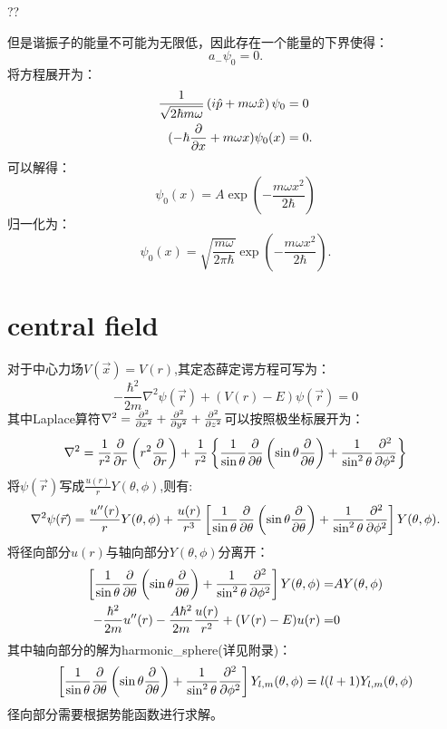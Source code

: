??


但是谐振子的能量不可能为无限低，因此存在一个能量的下界使得：
\begin{equation}
    a_-\psi_0=0.
\end{equation}
将方程展开为：
\begin{equation}
    \begin{aligned}
        \frac{1}{\sqrt{2\hbar m\omega}}\left(i\hat{p}+m\omega \hat{x}\right)\psi_0&=0\\
        (-\hbar\frac{\partial }{\partial x}+m\omega x)\psi_0(x)&=0.
    \end{aligned}
\end{equation}
可以解得：
\begin{equation}
    \psi_0(x)=A\exp\left(-\frac{m\omega x^2}{2\hbar}\right)
\end{equation}
归一化为：
\begin{equation}
    \psi_0(x)=\sqrt{\frac{m\omega}{2\pi\hbar}}\exp\left(-\frac{m\omega x^2}{2\hbar}\right).
\end{equation}

\section{central field}
对于中心力场$V(\vec{x})=V(r)$,其定态薛定谔方程可写为：
\begin{equation}
    -\frac{\hbar^2}{2m}\nabla^2\psi(\vec{r})+(V(r)-E)\psi(\vec{r})=0
\end{equation}
其中Laplace算符$\nabla^2=\frac{\partial^2 }{\partial x^2}+\frac{\partial^2 }{\partial y^2}+\frac{\partial^2 }{\partial z^2}$可以按照极坐标展开为：
\begin{equation}
    \nabla^2=\frac{1}{r^2}\frac{\partial }{\partial r}\left(r^2\frac{\partial }{\partial r}\right)+\frac{1}{r^2}\left\lbrace \frac{1}{\sin\theta}\frac{\partial }{\partial \theta}\left(\sin\theta\frac{\partial }{\partial \theta}\right)+\frac{1}{\sin^2\theta}\frac{\partial^2 }{\partial \phi^2}\right\rbrace
\end{equation}
将$\psi(\vec{r})$写成$\frac{u(r)}{r}Y(\theta,\phi)$,则有:
\begin{equation}
    \nabla^2\psi(\vec{r})=\frac{u''(r)}{r}Y(\theta,\phi)+\frac{u(r)}{r^3}\left[ \frac{1}{\sin\theta}\frac{\partial }{\partial \theta}\left(\sin\theta\frac{\partial }{\partial \theta}\right)+\frac{1}{\sin^2\theta}\frac{\partial^2 }{\partial \phi^2}\right]Y(\theta,\phi).
\end{equation}
将径向部分$u(r)$与轴向部分$Y(\theta,\phi)$分离开：
\begin{align}
    \left[ \frac{1}{\sin\theta}\frac{\partial }{\partial \theta}\left(\sin\theta\frac{\partial }{\partial \theta}\right)+\frac{1}{\sin^2\theta}\frac{\partial^2 }{\partial \phi^2}\right]Y(\theta,\phi)=&AY(\theta,\phi)\\
    -\frac{\hbar^2}{2m}u''(r)-\frac{A\hbar^2}{2m}\frac{u(r)}{r^2}+(V(r)-E)u(r)=&0
\end{align}
其中轴向部分的解为\gls{harmonic_sphere}(详见附录)：
\begin{equation}
    \left[ \frac{1}{\sin\theta}\frac{\partial }{\partial \theta}\left(\sin\theta\frac{\partial }{\partial \theta}\right)+\frac{1}{\sin^2\theta}\frac{\partial^2 }{\partial \phi^2}\right]Y_{l,m}(\theta,\phi)=l(l+1)Y_{l,m}(\theta,\phi)
\end{equation}
径向部分需要根据势能函数进行求解。

